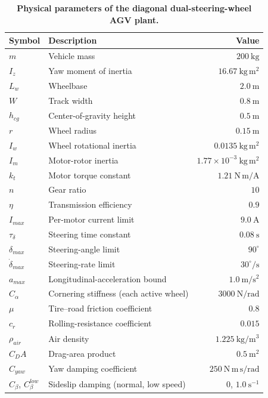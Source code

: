 \documentclass{ieeeaccess}
\begin{document}
\begin{table}[!t]
\centering
\caption{\textbf{Physical parameters of the diagonal dual-steering-wheel AGV plant.}}
\label{tab:agv_params}
\setlength{\tabcolsep}{3pt}
\begin{tabular}{|l|l|r|}
\hline
Symbol & Description & Value \\
\hline
$m$ & Vehicle mass & $200~\mathrm{kg}$ \\
$I_z$ & Yaw moment of inertia & $16.67~\mathrm{kg\,m^2}$ \\
$L_w$ & Wheelbase & $2.0~\mathrm{m}$ \\
$W$ & Track width & $0.8~\mathrm{m}$ \\
$h_{cg}$ & Center-of-gravity height & $0.5~\mathrm{m}$ \\
\hline
$r$ & Wheel radius & $0.15~\mathrm{m}$ \\
$I_w$ & Wheel rotational inertia & $0.0135~\mathrm{kg\,m^2}$ \\
$I_m$ & Motor-rotor inertia & $1.77\times10^{-3}~\mathrm{kg\,m^2}$ \\
$k_t$ & Motor torque constant & $1.21~\mathrm{N\,m/A}$ \\
$n$ & Gear ratio & $10$ \\
$\eta$ & Transmission efficiency & $0.9$ \\
$I_{max}$ & Per-motor current limit & $9.0~\mathrm{A}$ \\
\hline
$\tau_\delta$ & Steering time constant & $0.08~\mathrm{s}$ \\
$\delta_{max}$ & Steering-angle limit & $90^{\circ}$ \\
$\dot\delta_{max}$ & Steering-rate limit & $30^{\circ}/\mathrm{s}$ \\
$a_{max}$ & Longitudinal-acceleration bound & $1.0~\mathrm{m/s^2}$ \\
\hline
$C_{\alpha}$ & Cornering stiffness (each active wheel) & $3000~\mathrm{N/rad}$ \\
$\mu$ & Tire--road friction coefficient & $0.8$ \\
$c_r$ & Rolling-resistance coefficient & $0.015$ \\
$\rho_{air}$ & Air density & $1.225~\mathrm{kg/m^3}$ \\
$C_DA$ & Drag-area product & $0.5~\mathrm{m^2}$ \\
$C_{yaw}$ & Yaw damping coefficient & $250~\mathrm{N\,m\,s/rad}$ \\
$C_{\beta}$, $C_{\beta}^{low}$ & Sideslip damping (normal, low speed) & $0$, $1.0~\mathrm{s^{-1}}$ \\
\hline
\end{tabular}
\end{table}
\end{document}
